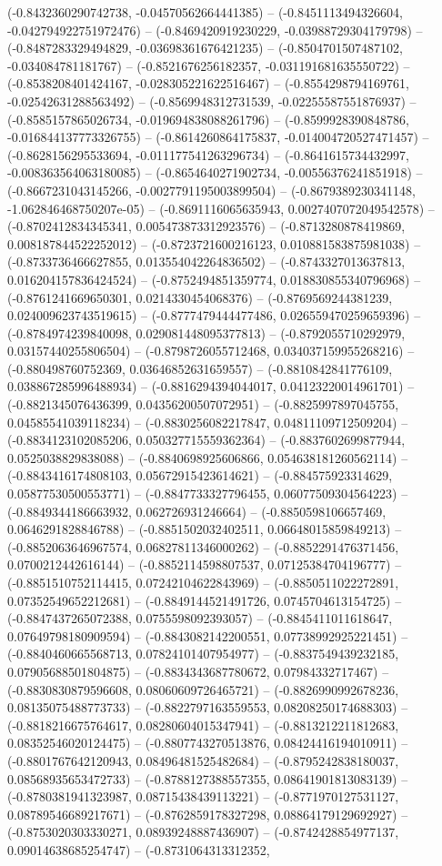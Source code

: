 (-0.8432360290742738, -0.04570562664441385) -- (-0.8451113494326604, -0.042794922751972476) -- (-0.8469420919230229, -0.03988729304179798) -- (-0.8487283329494829, -0.03698361676421235) -- (-0.8504701507487102, -0.034084781181767) -- (-0.8521676256182357, -0.031191681635550722) -- (-0.8538208401424167, -0.028305221622516467) -- (-0.8554298794169761, -0.02542631288563492) -- (-0.8569948312731539, -0.02255587551876937) -- (-0.8585157865026734, -0.019694838088261796) -- (-0.8599928390848786, -0.016844137773326755) -- (-0.8614260864175837, -0.014004720527471457) -- (-0.8628156295533694, -0.011177541263296734) -- (-0.8641615734432997, -0.008363564063180085) -- (-0.8654640271902734, -0.00556376241851918) -- (-0.8667231043145266, -0.0027791195003899504) -- (-0.8679389230341148, -1.062846468750207e-05) -- (-0.8691116065635943, 0.0027407072049542578) -- (-0.8702412834345341, 0.005473873312923576) -- (-0.8713280878419869, 0.008187844522252012) -- (-0.8723721600216123, 0.010881583875981038) -- (-0.8733736466627855, 0.013554042264836502) -- (-0.8743327013637813, 0.016204157836424524) -- (-0.8752494851359774, 0.018830855340796968) -- (-0.8761241669650301, 0.0214330454068376) -- (-0.8769569244381239, 0.024009623743519615) -- (-0.8777479444477486, 0.026559470259659396) -- (-0.8784974239840098, 0.029081448095377813) -- (-0.8792055710292979, 0.03157440255806504) -- (-0.8798726055712468, 0.034037159955268216) -- (-0.880498760752369, 0.03646852631659557) -- (-0.8810842841776109, 0.038867285996488934) -- (-0.8816294394044017, 0.04123220014961701) -- (-0.8821345076436399, 0.04356200507072951) -- (-0.8825997897045755, 0.04585541039118234) -- (-0.8830256082217847, 0.04811109712509204) -- (-0.8834123102085206, 0.050327715559362364) -- (-0.8837602699877944, 0.0525038829838088) -- (-0.8840698925606866, 0.054638181260562114) -- (-0.8843416174808103, 0.05672915423614621) -- (-0.884575923314629, 0.05877530500553771) -- (-0.8847733327796455, 0.06077509304564223) -- (-0.8849344186663932, 0.062726931246664) -- (-0.8850598106657469, 0.0646291828846788) -- (-0.8851502032402511, 0.06648015859849213) -- (-0.8852063646967574, 0.06827811346000262) -- (-0.8852291476371456, 0.0700212442616144) -- (-0.8852114598807537, 0.07125384704196777) -- (-0.8851510752114415, 0.07242104622843969) -- (-0.8850511022272891, 0.07352549652212681) -- (-0.8849144521491726, 0.0745704613154725) -- (-0.8847437265072388, 0.0755598092393057) -- (-0.8845411011618647, 0.07649798180909594) -- (-0.8843082142200551, 0.07738992925221451) -- (-0.8840460665568713, 0.07824101407954977) -- (-0.8837549439232185, 0.07905688501804875) -- (-0.8834343687780672, 0.07984332717467) -- (-0.8830830879596608, 0.08060609726465721) -- (-0.8826990992678236, 0.08135075488773733) -- (-0.8822797163559553, 0.08208250174688303) -- (-0.8818216675764617, 0.08280604015347941) -- (-0.8813212211812683, 0.08352546020124475) -- (-0.8807743270513876, 0.08424416194010911) -- (-0.8801767642120943, 0.08496481525482684) -- (-0.8795242838180037, 0.08568935653472733) -- (-0.8788127388557355, 0.08641901813083139) -- (-0.8780381941323987, 0.08715438439113221) -- (-0.8771970127531127, 0.08789546689217671) -- (-0.8762859178327298, 0.08864179129692927) -- (-0.8753020303330271, 0.08939248887436907) -- (-0.8742428854977137, 0.09014638685254747) -- (-0.8731064313312352, 
